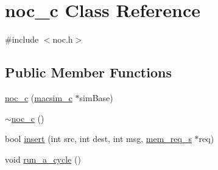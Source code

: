 \hypertarget{classnoc__c}{
\section{noc\_\-c Class Reference}
\label{classnoc__c}
}


{\ttfamily \#include $<$noc.h$>$}

\subsection*{Public Member Functions}
\begin{DoxyCompactItemize}
\item 
\hyperlink{classnoc__c_a2556f3c8da43c1465d1c28f6d47a770e}{noc\_\-c} (\hyperlink{classmacsim__c}{macsim\_\-c} $\ast$simBase)
\item 
\hyperlink{classnoc__c_ad703b0eb1327952d067be27b68bcd27a}{$\sim$noc\_\-c} ()
\item 
bool \hyperlink{classnoc__c_a06803a1031a3a7a7a7067a25a702f52f}{insert} (int src, int dest, int msg, \hyperlink{structmem__req__s}{mem\_\-req\_\-s} $\ast$req)
\item 
void \hyperlink{classnoc__c_ae8caf32a2cbc114cc4c43ca1ee2113c5}{run\_\-a\_\-cycle} ()
\end{DoxyCompactItemize}
